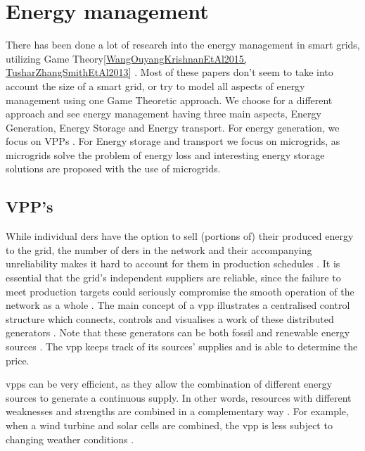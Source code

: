 \section{Energy management}\label{Energy-Management}
There has been done a lot of research into the energy management in smart grids, utilizing Game Theory\ref{WangOuyangKrishnanEtAl2015, TusharZhangSmithEtAl2013} . Most of these papers don't seem to take into account the size of a smart grid, or try to model all aspects of energy management using one Game Theoretic approach. We choose for a different approach and see energy management having three main aspects, Energy Generation, Energy Storage and Energy transport. For energy generation, we focus on \ac{VPP}s . For Energy storage and transport we focus on microgrids, as microgrids solve the problem of energy loss and interesting energy storage solutions are proposed with the use of microgrids.

\subsection{VPP's}
While individual \acp{der} have the option to sell (portions of) their produced energy to the grid, the number of \acp{der} in the network and their accompanying unreliability makes it hard to account for them in production schedules \cite{RobuKotaChalkiadakisEtAl2012}. It is essential that the grid's independent suppliers are reliable, since the failure to meet production targets could seriously compromise the smooth operation of the network as a whole \cite{ChalkiadakisRobuKotaEtAl2011}. The main concept of a \ac{vpp} illustrates a centralised control structure which connects, controls and visualises a work of these distributed generators \cite{NikonowiczMilewski2012}. Note that these generators can be both fossil and renewable energy sources \cite{LombardiPowalkoRudion2009}. The \ac{vpp} keeps track of its sources' supplies and is able to determine the price. 

\acp{vpp} can be very efficient, as they allow the combination of different energy sources to generate a continuous supply. In other words, resources with different weaknesses and strengths are combined in a complementary way \cite{Koeppel2003}. For example, when a wind turbine and solar cells are combined, the \ac{vpp} is less subject to changing weather conditions \cite{Tromly2001, Kumagai2012, MashhourMoghaddas-Tafreshi2011, NikonowiczMilewski2012}. 

